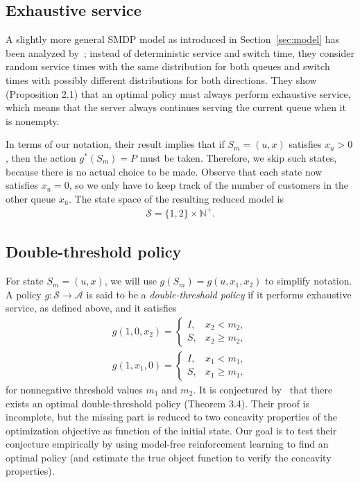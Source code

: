 \documentclass{article}
\theoremstyle{definition}
\theoremstyle{plain}
\begin{document}
\subsection{Exhaustive service}

A slightly more general SMDP model as introduced in Section~\ref{sec:model} has
been analyzed by~\cite{hofriOptimalControlTwo1987}; instead of deterministic
service and switch time, they consider random service times with the same
distribution for both queues and switch times with possibly different
distributions for both directions. They show (Proposition 2.1) that an optimal
policy must always perform exhaustive service, which means that the server
always continues serving the current queue when it is nonempty.

In terms of our notation, their result implies that if $S_{m} = (u, x)$
satisfies $x_{u} > 0$, then the action $g^{*}(S_{m}) = P$ must be taken.
Therefore, we skip such states, because there is no actual choice to be made.
Observe that each state now satisfies $x_{u} = 0$, so we only have to keep track
of the number of customers in the other queue $x_{\bar{u}}$. The state space of
the resulting reduced model is
\begin{align}
  \mathcal{S} = \{1,2\} \times \mathbb{N}^{+} .
\end{align}

\subsection{Double-threshold policy}

For state $S_{m} = (u, x)$, we will use $g(S_{m}) = g(u, x_{1}, x_{2})$ to
simplify notation. A policy $g : \mathcal{S} \rightarrow \mathcal{A}$ is said to
be a \textit{double-threshold policy} if it performs exhaustive service, as
defined above, and it satisfies
\begin{subequations}
\begin{align}
  g(1, 0, x_{2}) = \begin{cases}
                     I, & x_{2} < m_{2} , \\
                     S, & x_{2} \geq m_{2} ,
                    \end{cases} \\
  g(1, x_{1}, 0) = \begin{cases}
                     I, & x_{1} < m_{1} , \\
                     S, & x_{1} \geq m_{1} ,
                    \end{cases}
\end{align}
\end{subequations}
for nonnegative threshold values $m_{1}$ and $m_{2}$. It is conjectured
by~\cite{hofriOptimalControlTwo1987} that there exists an optimal
double-threshold policy (Theorem 3.4). Their proof is incomplete, but the
missing part is reduced to two concavity properties of the optimization
objective as function of the initial state. Our goal is to test their conjecture
empirically by using model-free reinforcement learning to find an optimal policy
(and estimate the true object function to verify the concavity properties).
\end{document}
